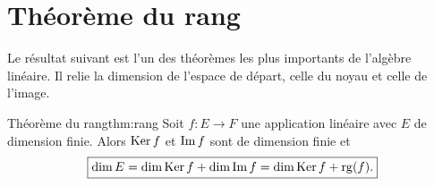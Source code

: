 \section{Théorème du rang}\label{sec:thm-rang}

Le résultat suivant est l'un des théorèmes les plus importants de
l'algèbre linéaire. Il relie la dimension de l'espace de départ, celle
du noyau et celle de l'image.

\begin{theorem}{Théorème du rang}{thm:rang}
  Soit $f\colon E\to F$ une application linéaire avec $E$ de dimension
  finie. Alors $\operatorname{Ker} f$ et $\operatorname{Im} f$ sont de dimension finie et
  \[
    \boxed{\dim E = \dim\operatorname{Ker} f + \dim\operatorname{Im} f = \dim\operatorname{Ker} f + \operatorname{rg}(f).}
  \]
\end{theorem}


